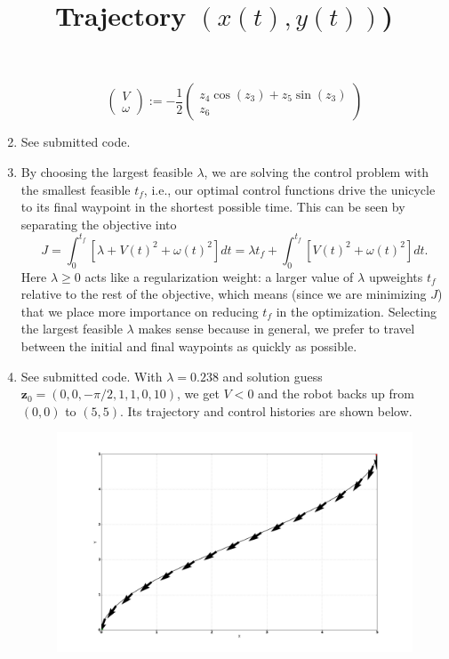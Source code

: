 \documentclass[12pt]{article}
\begin{document}
\begin{enumerate}
	\begin{equation}\label{eqn:1_1_bvp_Vom}
		\left(\begin{array}{c}
		V \\
		\omega
		\end{array}\right) :=
		-\frac{1}{2}\left(\begin{array}{c}
		z_4\cos(z_3) + z_5\sin(z_3) \\
		z_6
		\end{array}\right)
	\end{equation}
	\item See submitted code.
	\item By choosing the largest feasible $\lambda$, we are solving the control problem with the smallest feasible $t_f$, i.e., our optimal control functions drive the unicycle to its final waypoint in the shortest possible time. This can be seen by separating the objective into
	\[
		J = \int_0^{t_f} [\lambda + V(t)^2 + \omega(t)^2]dt = \lambda t_f + \int_0^{t_f} [V(t)^2 + \omega(t)^2]dt.
	\]
	Here $\lambda \geq 0$ acts like a regularization weight: a larger value of $\lambda$ upweights $t_f$ relative to the rest of the objective, which means (since we are minimizing $J$) that we place more importance on reducing $t_f$ in the optimization. Selecting the largest feasible $\lambda$ makes sense because in general, we prefer to travel between the initial and final waypoints as quickly as possible.
	\item See submitted code. With $\lambda = 0.238$ and solution guess $\mathbf{z}_0 = (0, 0, -\pi/2, 1, 1, 0, 10)$, we get $V < 0$ and the robot backs up from $(0,0)$ to $(5,5)$. Its trajectory and control histories are shown below.
	\begin{figure}[H]
		\centering
		\title{\bf Trajectory $(x(t), y(t))$)}
		\includegraphics[width=\textwidth]{../Figures/hw1_1_iv_a.png}

\end{figure}
\end{enumerate}
\end{document}
